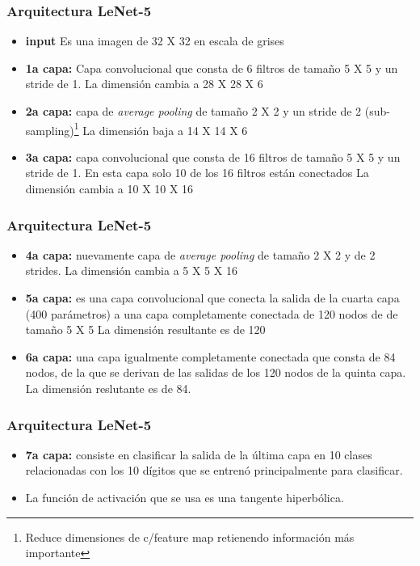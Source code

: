 \documentclass[xcolor=dvipsnames, compress]{beamer}
\begin{document}
\begin{frame}
\frametitle{Arquitectura LeNet-5}
\begin{itemize}

	\item \textbf{input} Es una imagen de 32 X 32 en escala de grises
	
	\item \textbf{1a capa:} Capa convolucional que consta de 6 filtros de tamaño 5 X 5 y un stride de 1.
	La dimensión cambia a 28 X 28 X 6
	
	\item \textbf{2a capa:} capa de \emph{average pooling} de tamaño 2 X 2 y un stride de 2 (sub-sampling)\footnote{Reduce dimensiones de c/feature map retienendo información más importante}
	La dimensión baja a 14 X 14 X 6
	
	\item \textbf{3a capa:} capa convolucional que consta de 16 filtros de tamaño 5 X 5 y un stride de 1. En esta capa solo 10 de los 16 filtros están conectados
	La dimensión cambia a 10 X 10 X 16
	

\end{itemize}

\end{frame}

\begin{frame}
\frametitle{Arquitectura LeNet-5}
\begin{itemize}
	
	\item \textbf{4a capa:} nuevamente  capa de \emph{average pooling} de tamaño 2 X 2 y de 2 strides.
	La dimensión cambia a 5 X 5 X 16

	\item \textbf{5a capa:} es una capa convolucional que conecta la salida de la cuarta capa (400 parámetros) a una capa completamente conectada de 120 nodos de de tamaño 5 X 5
	La dimensión resultante es de 120
	
	\item \textbf{6a capa:} una capa igualmente completamente conectada que consta de 84 nodos, de la que se derivan de las salidas de los 120 nodos de la quinta capa.
	La dimensión reslutante es de 84.
	
\end{itemize}

\end{frame}

\begin{frame}
\frametitle{Arquitectura LeNet-5}
\begin{itemize}

	\item \textbf{7a capa:} consiste en clasificar la salida de la última capa en 10 clases relacionadas con los 10 dígitos que se entrenó principalmente para clasificar.

	\item La función de activación que se usa es una tangente hiperbólica.
	
\end{itemize}
\end{frame}
\end{document}
